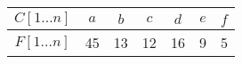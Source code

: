 \begin{frame}{}
  \begin{table}
    \centering
    \renewcommand*{\arraystretch}{1.3}
    \begin{tabular}{|c|c|c|c|c|c|c|}
      \hline
      $C[1 \dots n]$ & $a$ & $b$ & $c$ & $d$ & $e$ & $f$ \\ \hline
      $F[1 \dots n]$ & 45 & 13 & 12 & 16 & 9 & 5 \\ \hline
    \end{tabular}
  \end{table}

\end{frame}
